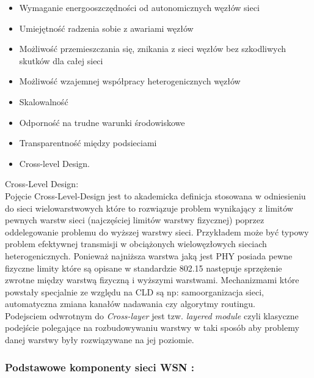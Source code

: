 \begin{itemize}
  \item Wymaganie energooszczędności od autonomicznych węzłów sieci
  \item Umiejętność radzenia sobie z awariami węzłów
  \item Możliwość przemieszczania się, znikania z sieci węzłów bez szkodliwych skutków dla całej sieci
  \item Możliwość wzajemnej współpracy heterogenicznych węzłów
  \item Skalowalność
  \item Odporność na trudne warunki środowiskowe
  \item Transparentność między podsieciami
  \item Cross-level Design.
\end{itemize}
\par Cross-Level Design: \\
Pojęcie Cross-Level-Design jest to akademicka definicja stosowana w odniesieniu do sieci wielowarstwowych które to rozwiązuje problem wynikający z limitów pewnych warstw sieci (najczęściej limitów warstwy fizycznej) poprzez oddelegowanie problemu do wyższej warstwy sieci.
Przykładem może być typowy problem efektywnej transmisji w obciążonych wielowęzłowych sieciach heterogenicznych. Ponieważ najniższa warstwa jaką jest PHY posiada pewne fizyczne limity które są opisane w standardzie 802.15 następuje sprzężenie zwrotne między warstwą fizyczną i wyższymi warstwami. Mechanizmami które powstały specjalnie ze względu na CLD są np: samoorganizacja sieci, automatyczna zmiana kanałów nadawania czy algorytmy routingu.\\
Podejsciem odwrotnym do \textit{Cross-layer} jest tzw. \textit{layered module} czyli klasyczne podejście polegające na rozbudowywaniu warstwy w taki sposób aby problemy danej warstwy były rozwiązywane na jej poziomie.
\\

\subsubsection{Podstawowe komponenty sieci WSN :} 


